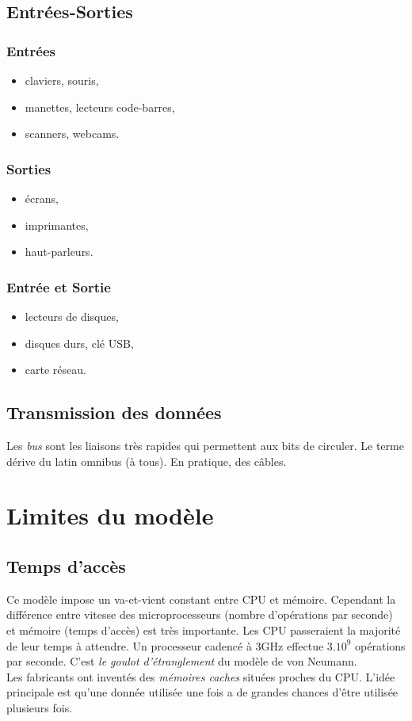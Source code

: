 \documentclass[a4paper,11pt]{article}
\begin{document}
\begin{Form}
\subsection{Entrées-Sorties}
\subsubsection{Entrées}
\begin{itemize}
\item claviers, souris,
\item manettes, lecteurs code-barres,
\item scanners, webcams.
\end{itemize}
\subsubsection{Sorties}
\begin{itemize}
\item écrans,
\item imprimantes,
\item haut-parleurs.
\end{itemize}
\subsubsection{Entrée et Sortie}
\begin{itemize}
\item lecteurs de disques,
\item disques durs, clé USB,
\item carte réseau.
\end{itemize}
\subsection{Transmission des données}
Les \emph{bus} sont les liaisons très rapides qui permettent aux bits de circuler. Le terme dérive du latin omnibus (à tous). En pratique, des câbles.
\section{Limites du modèle}
\subsection{Temps d'accès}
Ce modèle impose un va-et-vient constant entre CPU et mémoire. Cependant la différence entre vitesse des microprocesseurs (nombre d'opérations par seconde) et mémoire (temps d'accès) est très importante. Les CPU passeraient la majorité de leur temps à attendre. Un processeur cadencé à 3GHz effectue $3.10^9$ opérations par seconde. C'est \emph{le goulot d'étranglement} du modèle de von Neumann.\\Les fabricants ont inventés des \emph{mémoires caches} situées proches du CPU. L'idée principale est qu'une donnée utilisée une fois a de grandes chances d'être utilisée plusieurs fois.

\end{Form}
\end{document}
